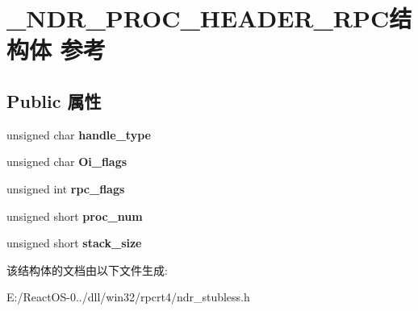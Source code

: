 \hypertarget{struct___n_d_r___p_r_o_c___h_e_a_d_e_r___r_p_c}{}\section{\+\_\+\+N\+D\+R\+\_\+\+P\+R\+O\+C\+\_\+\+H\+E\+A\+D\+E\+R\+\_\+\+R\+P\+C结构体 参考}
\label{struct___n_d_r___p_r_o_c___h_e_a_d_e_r___r_p_c}
\subsection*{Public 属性}
\begin{DoxyCompactItemize}
\item 
\mbox{\label{struct___n_d_r___p_r_o_c___h_e_a_d_e_r___r_p_c_a1021e49df7c19bd058b98c194c68a28d}} 
unsigned char {\bfseries handle\+\_\+type}
\item 
\mbox{\label{struct___n_d_r___p_r_o_c___h_e_a_d_e_r___r_p_c_ab3bf202b44565d8edf2faa338dfa65f6}} 
unsigned char {\bfseries Oi\+\_\+flags}
\item 
\mbox{\label{struct___n_d_r___p_r_o_c___h_e_a_d_e_r___r_p_c_a4f977b5cb430d413da32f1f145c5aaa0}} 
unsigned int {\bfseries rpc\+\_\+flags}
\item 
\mbox{\label{struct___n_d_r___p_r_o_c___h_e_a_d_e_r___r_p_c_ade9aa9a38ba23e849ad8a4025c152f2d}} 
unsigned short {\bfseries proc\+\_\+num}
\item 
\mbox{\label{struct___n_d_r___p_r_o_c___h_e_a_d_e_r___r_p_c_acd1db3128fe0b52908d4ef3106bc2588}} 
unsigned short {\bfseries stack\+\_\+size}
\end{DoxyCompactItemize}


该结构体的文档由以下文件生成\+:\begin{DoxyCompactItemize}
\item 
E\+:/\+React\+O\+S-\/0../dll/win32/rpcrt4/ndr\+\_\+stubless.\+h\end{DoxyCompactItemize}
